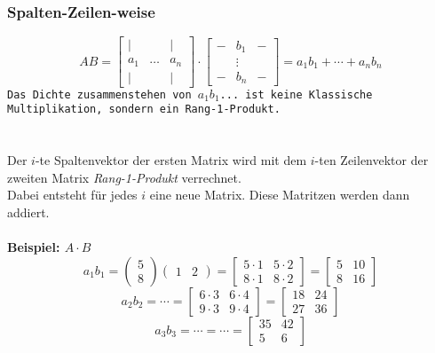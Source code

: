 \documentclass[12pt,a4paper]{article}
\begin{document}
\subsubsection{Spalten-Zeilen-weise}
\[
AB =
\begin{bmatrix}
    \vert & & \vert \\
    a_1 & \dots & a_n \\
    \vert & & \vert
\end{bmatrix}
\cdot
\begin{bmatrix}
    - & b_1 & - \\
    & \vdots & \\
    - & b_n & -
\end{bmatrix}
=
a_1b_1 + \cdots + a_nb_n
\]
\texttt{Das Dichte zusammenstehen von $a_1b_1$... ist keine Klassische Multiplikation, sondern ein Rang-1-Produkt.} \\
\\ \\
Der $i$-te Spaltenvektor der ersten Matrix wird mit dem $i$-ten Zeilenvektor der zweiten Matrix \textit{Rang-1-Produkt} verrechnet. \\ Dabei entsteht für jedes $i$ eine neue Matrix. Diese Matritzen werden dann addiert. \\ \\
\textbf{Beispiel: $A \cdot B$} \\
\[
a_1b_1 = \begin{pmatrix}
    5 \\
    8
\end{pmatrix}
\begin{pmatrix}
    1 & 2
\end{pmatrix}
=
\begin{bmatrix}
    5 \cdot 1 & 5 \cdot 2 \\
    8 \cdot 1 & 8 \cdot 2
\end{bmatrix}
=
\begin{bmatrix}
    5 & 10 \\
    8 & 16
\end{bmatrix}
\]
\[
a_2b_2 = \cdots = \begin{bmatrix}
    6 \cdot 3 & 6 \cdot 4 \\
    9 \cdot 3 & 9 \cdot 4
\end{bmatrix}
=
\begin{bmatrix}
    18 & 24 \\
    27 & 36
\end{bmatrix}
\]
\[
a_3b_3 = \cdots = \cdots = \begin{bmatrix}
    35 & 42 \\
    5 & 6
\end{bmatrix}
\]
\end{document}
